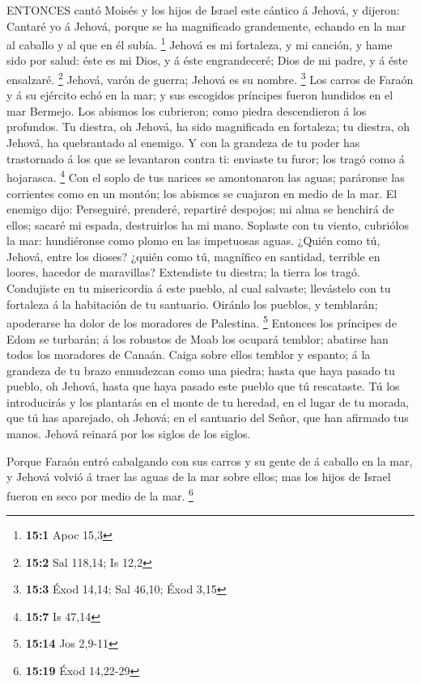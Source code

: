  ENTONCES cantó Moisés y los hijos de Israel este cántico á
Jehová, y dijeron: Cantaré yo á Jehová, porque se ha magnificado
grandemente, echando en la mar al caballo y al que en él subía.
\footnote{\textbf{15:1} Apoc 15,3}  Jehová es mi fortaleza,
y mi canción, y hame sido por salud: éste es mi Dios, y á éste
engrandeceré; Dios de mi padre, y á éste ensalzaré. \footnote{\textbf{15:2}
  Sal 118,14; Is 12,2}  Jehová, varón de guerra; Jehová es
su nombre. \footnote{\textbf{15:3} Éxod 14,14; Sal 46,10; Éxod 3,15}
 Los carros de Faraón y á su ejército echó en la mar; y sus
escogidos príncipes fueron hundidos en el mar Bermejo.  Los
abismos los cubrieron; como piedra descendieron á los profundos.
 Tu diestra, oh Jehová, ha sido magnificada en fortaleza; tu
diestra, oh Jehová, ha quebrantado al enemigo.  Y con la
grandeza de tu poder has trastornado á los que se levantaron contra ti:
enviaste tu furor; los tragó como á hojarasca. \footnote{\textbf{15:7}
  Is 47,14}  Con el soplo de tus narices se amontonaron las
aguas; paráronse las corrientes como en un montón; los abismos se
cuajaron en medio de la mar.  El enemigo dijo: Perseguiré,
prenderé, repartiré despojos; mi alma se henchirá de ellos; sacaré mi
espada, destruirlos ha mi mano.  Soplaste con tu viento,
cubriólos la mar: hundiéronse como plomo en las impetuosas aguas.
 ¿Quién como tú, Jehová, entre los dioses? ¿quién como tú,
magnífico en santidad, terrible en loores, hacedor de maravillas?
 Extendiste tu diestra; la tierra los tragó. 
Condujiste en tu misericordia á este pueblo, al cual salvaste;
llevástelo con tu fortaleza á la habitación de tu santuario.
 Oiránlo los pueblos, y temblarán; apoderarse ha dolor de
los moradores de Palestina. \footnote{\textbf{15:14} Jos 2,9-11}
 Entonces los príncipes de Edom se turbarán; á los robustos
de Moab los ocupará temblor; abatirse han todos los moradores de Canaán.
 Caiga sobre ellos temblor y espanto; á la grandeza de tu
brazo enmudezcan como una piedra; hasta que haya pasado tu pueblo, oh
Jehová, hasta que haya pasado este pueblo que tú rescataste.
 Tú los introducirás y los plantarás en el monte de tu
heredad, en el lugar de tu morada, que tú has aparejado, oh Jehová; en
el santuario del Señor, que han afirmado tus manos.  Jehová
reinará por los siglos de los siglos.

 Porque Faraón entró cabalgando con sus carros y su gente
de á caballo en la mar, y Jehová volvió á traer las aguas de la mar
sobre ellos; mas los hijos de Israel fueron en seco por medio de la mar.
\footnote{\textbf{15:19} Éxod 14,22-29}

